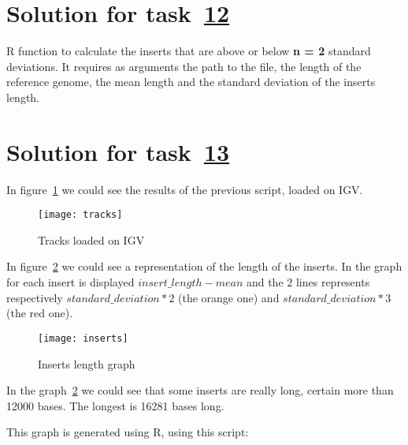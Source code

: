 \section{Solution for task~\hyperref[itm:2.12]{12}}
R function to calculate the inserts that are above or below \textbf{n = 2}
standard deviations. It requires as arguments the path to the  file,
the length of the reference genome, the mean length and the standard deviation
of the inserts length.
\scriptusage


\section{Solution for task~\hyperref[itm:2.13]{13}}
In figure~\ref{fig:tracks} we could see the results of the previous script,
loaded on IGV.
\begin{figure}[H]
\texttt{[image: tracks]}
\caption{Tracks loaded on IGV}
\label{fig:tracks}
\end{figure}

In figure~\ref{fig:inserts} we could see a representation of the length of the
inserts. In the graph for each insert is displayed $insert\_length - mean$ and
the 2 lines represents respectively $standard\_deviation * 2$ (the orange one)
and $standard\_deviation * 3$ (the red one).
\begin{figure}[H]
\centering
\texttt{[image: inserts]}
\caption{Inserts length graph}
\label{fig:inserts}
\end{figure}

In the graph~\ref{fig:inserts} we could see that some inserts are really long,
certain more than 12000 bases. The longest is 16281 bases long.

This graph is generated using R, using this script:

